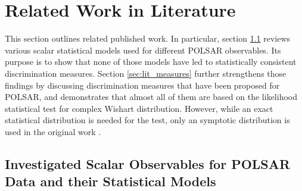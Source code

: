 \documentclass[journal]{IEEEtran}
\begin{document}
\section{Related Work in Literature}
\label{sec:lit_review}

This section outlines related published work.
In particular, section \ref{sec:lit_models} reviews various scalar statistical models used for different POLSAR observables.
Its purpose is to show that none of those  models have led to statistically consistent discrimination measures. 
Section \ref{sec:lit_measures} further strengthens those findings by discussing discrimination measures that have been proposed for POLSAR,
  and demonstrates that almost all of them are based on the likelihood statistical test for complex Wishart distribution.
However, while an exact statistical distribution is needed for the test,
  only an symptotic distribution is used in the original work \cite{Conradsen_2003_TGRS_4}.
  

\subsection{Investigated Scalar Observables for POLSAR Data and their Statistical Models}
\label{sec:lit_models}
\end{document}

